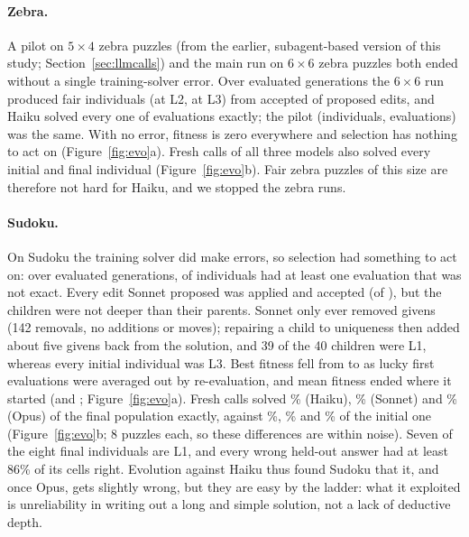 \paragraph{Zebra.} A pilot on $5{\times}4$ zebra puzzles (from the earlier, subagent-based version of this study; Section~\ref{sec:llmcalls}) and the main run on $6{\times}6$ zebra puzzles both ended without a single training-solver error. Over \EFourZebraGens evaluated generations the $6{\times}6$ run produced \EFourZebraIndiv fair individuals (\EFourZebraLB at L2, \EFourZebraLC at L3) from \EFourZebraAccepted accepted of \EFourZebraProposals proposed edits, and Haiku solved every one of \EFourZebraEvals evaluations exactly; the pilot (\EFourPilotIndiv individuals, \EFourPilotEvals evaluations) was the same. With no error, fitness is zero everywhere and selection has nothing to act on (Figure~\ref{fig:evo}a). Fresh calls of all three models also solved every initial and final individual (Figure~\ref{fig:evo}b). Fair zebra puzzles of this size are therefore not hard for Haiku, and we stopped the zebra runs.

\paragraph{Sudoku.} On Sudoku the training solver did make errors, so selection had something to act on: over \EFourSudokuGens evaluated generations, \EFourSudokuWithError of \EFourSudokuIndiv individuals had at least one evaluation that was not exact. Every edit Sonnet proposed was applied and accepted (\EFourSudokuAccepted of \EFourSudokuProposals), but the children were not deeper than their parents. Sonnet only ever removed givens (142 removals, no additions or moves); repairing a child to uniqueness then added about five givens back from the solution, and 39 of the 40 children were L1, whereas every initial individual was L3. Best fitness fell from \EFourSudokuBestStart to \EFourSudokuBestEnd as lucky first evaluations were averaged out by re-evaluation, and mean fitness ended where it started (\EFourSudokuMeanStart and \EFourSudokuMeanEnd; Figure~\ref{fig:evo}a). Fresh calls solved \EFourSudokuFinalHaiku\% (Haiku), \EFourSudokuFinalSonnet\% (Sonnet) and \EFourSudokuFinalOpus\% (Opus) of the final population exactly, against \EFourSudokuInitialHaiku\%, \EFourSudokuInitialSonnet\% and \EFourSudokuInitialOpus\% of the initial one (Figure~\ref{fig:evo}b; 8 puzzles each, so these differences are within noise). Seven of the eight final individuals are L1, and every wrong held-out answer had at least 86\% of its cells right. Evolution against Haiku thus found Sudoku that it, and once Opus, gets slightly wrong, but they are easy by the ladder: what it exploited is unreliability in writing out a long and simple solution, not a lack of deductive depth.
